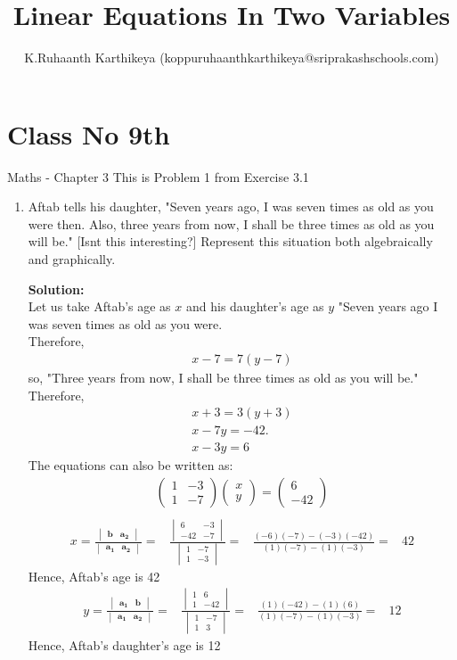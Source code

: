 \documentclass[12pt]{article}
\title{Linear Equations In Two Variables}
\author{K.Ruhaanth Karthikeya (koppuruhaanthkarthikeya@sriprakashschools.com)}
\newcommand{\myvec}[1]{\ensuremath{\begin{pmatrix}#1\end{pmatrix}}}
\newcommand{\mydet}[1]{\ensuremath{\begin{vmatrix}#1\end{vmatrix}}}
\newcommand{\solution}{\noindent \textbf{Solution: }}
\providecommand{\brak}[1]{\ensuremath{\left(#1\right)}}
\let\vec\mathbf
\begin{document}
\maketitle
\section*{Class No 9th} { Maths - Chapter 3}
This is Problem 1 from Exercise 3.1
\begin{enumerate}
\item Aftab tells his daughter, "Seven years ago,
I was seven times as old as you were then. Also, three years from 
now, I shall be three times as old as you will be." [Isnt this interesting?] Represent this situation both algebraically and graphically.

\solution \\ Let us take Aftab's age as $x$ and his daughter's age as $y$
"Seven years ago I was seven times as old as you were.\\
Therefore,
\begin{align}
    x-7 = 7{\brak{y-7}}
\end{align}
so,
"Three years from now, I shall be three times as old as you will be."
Therefore,\\ 
\begin{align}
    x+3 = 3{\brak{y+3}}\\
x-7y = -42. \\
x-3y=6
\end{align}
The equations can also be written as:\\
\begin{align}
\myvec{1&-3\\1&-7}\myvec{x\\y}=\myvec{6\\-42}\\
\end{align}
\begin{align}
x =\frac{\mydet{ \vec{b} & \vec{a_2}}}{\mydet{ \vec{a_1} & \vec{a_2}}} = &
\frac{\mydet{6&-3\\-42&-7}}{ \mydet{1&-7\\1&-3}} =&
\frac{\brak{-6}\brak{-7} - \brak{-3}\brak{-42}}{\brak{1} \brak{-7}-
\brak{1}\brak{-3}} =& 42
\end{align}
Hence, Aftab's age is 42
\begin{align}
y = \frac{\mydet{ \vec{a_1} & \vec{b}}}{\mydet{ \vec{a_1} & \vec{a_2}}}=&
\frac{\mydet{1&6\\1&-42}}{ \mydet{1&-7\\1&3}}=&
\frac{\brak{1} \brak{-42} - \brak{1}\brak{6}}{\brak{1}\brak{-7} - \brak{1}\brak{-3}} =& 12
\end{align}
 Hence, Aftab's daughter's age is 12

\end{enumerate}
\end{document}
